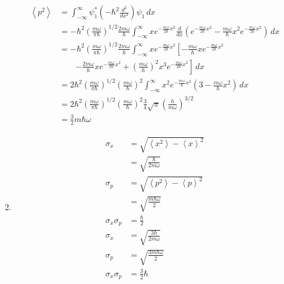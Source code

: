\documentclass{article}
\newcommand{\ev}[1]{\left< #1 \right>}
\begin{document}
\begin{enumerate}
\begin{align*}
          \ev{p^2}  & = \int_{-\infty}^\infty \psi_1^* \left( -\hbar^2 \frac{d^2}{d x^2} \right) \psi_1 \,d x                                                                                                                                                                                             \\
                    & = -\hbar^2 \left( \frac{m \omega}{\pi \hbar} \right)^{1 / 2} \frac{2 m \omega}{\hbar} \int_{-\infty}^\infty x e^{-\frac{m \omega}{2 \hbar} x^2} \frac{d}{d x} \left( e^{-\frac{m \omega}{2 \hbar} x^2} - \frac{m \omega}{\hbar} x^2 e^{-\frac{m \omega}{2 \hbar} x^2} \right) \,d x \\
                    & = -\hbar^2 \left( \frac{m \omega}{\pi \hbar} \right)^{1 / 2} \frac{2 m \omega}{\hbar} \int_{-\infty}^\infty x e^{-\frac{m \omega}{2 \hbar} x^2} \left[ -\frac{m \omega}{\hbar} x e^{-\frac{m \omega}{2 \hbar} x^2} \right.                                                          \\
                    & \qquad \left. - \frac{2 m \omega}{\hbar} x e^{-\frac{m \omega}{2 \hbar} x^2} + \left( \frac{m \omega}{\hbar} \right)^2 x^3 e^{-\frac{m \omega}{2 \hbar} x^2} \right] \,d x                                                                                                          \\
                    & = 2 \hbar^2 \left( \frac{m \omega}{\pi \hbar} \right)^{1 / 2} \left( \frac{m \omega}{\hbar} \right)^2 \int_{-\infty}^\infty x^2 e^{-\frac{m \omega}{\hbar} x^2} \left( 3 - \frac{m \omega}{\hbar} x^2 \right) \,d x                                                                 \\
                    & = 2 \hbar^2 \left( \frac{m \omega}{\pi \hbar} \right)^{1 / 2} \left( \frac{m \omega}{\hbar} \right)^2 \frac{3}{4} \sqrt{\pi} \left( \frac{h}{m \omega} \right)^{3 / 2}                                                                                                              \\
                    & = \frac{3}{2} m \hbar \omega
        \end{align*}

  \item

        \begin{align*}
          \sigma_x          & = \sqrt{\ev{x^2} - \ev{x}^2}        \\
                            & = \sqrt{\frac{\hbar}{2 m \omega}}   \\
          \sigma_p          & = \sqrt{\ev{p^2} - \ev{p}^2}        \\
                            & = \sqrt{\frac{m \hbar \omega}{2}}   \\
          \sigma_x \sigma_p & = \frac{\hbar}{2}                   \\
          \sigma_x          & = \sqrt{\frac{3 \hbar}{2 m \omega}} \\
          \sigma_p          & = \sqrt{\frac{3 m \hbar \omega}{2}} \\
          \sigma_x \sigma_p & = \frac{3}{2} \hbar
        \end{align*}


\end{enumerate}
\end{document}
